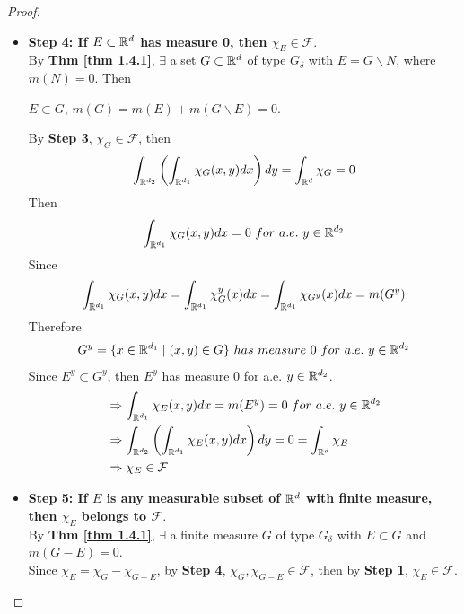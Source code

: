 \begin{proof}
\begin{itemize}
 			\item \textbf{Step 4: If $E \subset \mathbb{R}^d$ has measure 0, then $\chi_E \in \mathcal{F}$}. \\
 			By \textbf{Thm \ref{thm 1.4.1}}, $\exists$ a set $G \subset \mathbb{R}^d$ of type $G_{\delta}$ with $E = G \backslash N$, where $m(N) = 0$. Then
 			\begin{center}
 				$E \subset G$, $m(G) = m(E) + m(G \backslash E) = 0$.
 			\end{center}
 			By \textbf{Step 3}, $\chi_G \in \mathcal{F}$, then
 			\begin{align}
 				\int_{\mathbb{R}^{d_2}}{\left( \int_{\mathbb{R}^{d_1}}{\chi_{G}(x , y) dx} \right) dy}
 				= \int_{\mathbb{R}^d}{\chi_G} = 0
 			\end{align}
 			Then
 			\begin{align}
 				\int_{\mathbb{R}^{d_1}}{\chi_{G}(x , y) dx} = 0 \,\, for \,\, a.e. \,\, y \in \mathbb{R}^{d_2}
 			\end{align}
 			Since
 			\begin{align}
 				\int_{\mathbb{R}^{d_1}}{\chi_{G}(x , y) dx} = \int_{\mathbb{R}^{d_1}}{\chi_{G}^{y}(x) dx} = \int_{\mathbb{R}^{d_1}}{\chi_{G^y}(x) dx} = m(G^y)
 			\end{align}
 			Therefore
 			\begin{align}
 				G^y = \{ x \in \mathbb{R}^{d_1} \mid (x , y) \in G \} \,\, has \,\, measure \,\, 0 \,\, for \,\, a.e. \,\, y \in \mathbb{R}^{d_2}
 			\end{align}
 			Since $E^y \subset G^y$, then $E^y$ has measure 0 for a.e. $y \in \mathbb{R}^{d_2}$.
 			\begin{align}
 				&\Rightarrow \int_{\mathbb{R}^{d_1}}{\chi_{E}(x , y) dx} = m(E^y) = 0 \,\, for \,\, a.e. \,\, y \in \mathbb{R}^{d_2} \\
 				&\Rightarrow \int_{\mathbb{R}^{d_2}}{\left( \int_{\mathbb{R}^{d_1}}{\chi_{E}(x , y) dx} \right) dy} = 0 = \int_{\mathbb{R}^d}{\chi_E} \\
 				&\Rightarrow \chi_E \in \mathcal{F}
 			\end{align}
 		
 			\vspace{6em}
 			
 			\item \textbf{Step 5: If $E$ is any measurable subset of $\mathbb{R}^d$ with finite measure, then $\chi_E$ belongs to $\mathcal{F}$}. \\
 			By \textbf{Thm \ref{thm 1.4.1}}, $\exists$ a finite measure $G$ of type $G_{\delta}$ with $E \subset G$ and $m(G - E) = 0$.\\
 			Since $\chi_E = \chi_{G} - \chi_{G - E}$, by \textbf{Step 4}, $\chi_G , \chi_{G - E} \in \mathcal{F}$, then by \textbf{Step 1}, $\chi_E \in \mathcal{F}$.
 			

\end{itemize}
\end{proof}
